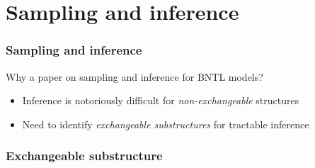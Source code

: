 \documentclass[final,hyperref={pdfpagelabels=false},noamsthm]{beamer}
\begin{document}
%
%


\section{Sampling and inference}
\begin{frame}
	\frametitle{Sampling and inference}
	Why a paper on sampling and inference for BNTL models?
	\pause
	\begin{itemize}
		\item Inference is notoriously difficult for \textit{non-exchangeable} structures
		\item Need to identify \textit{exchangeable substructures} for tractable inference
	\end{itemize}
\end{frame}

\begin{frame}
	\frametitle{Exchangeable substructure}
	\begin{center}
		\resizebox{\textwidth}{!}{}
	\end{center}
\end{frame}
\end{document}
